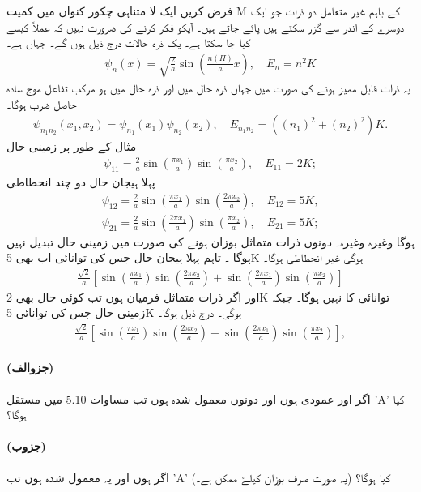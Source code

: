 فرض کریں ایک لا متناہی چکور کنواں میں کمیت M کے باہم غیر متعامل دو ذرات جو ایک دوسرے کے اندر سے گزر سکتے ہیں پائے جاتے ہیں۔ آپکو فکر کرنے کی ضرورت نہیں کہ عملاً کیسے کیا جا سکتا ہے۔ یک ذرہ حالات درج ذیل ہوں گے۔ جہاں 
ہے۔
\begin{align*}
 \psi_{n} (x)=\sqrt{\frac{2}{a}}\sin(\frac{n (\Pi)}{a}x), \quad E_{n}=n^2 K 
\end{align*}
یہ ذرات قابل ممیز ہونے کی صورت میں جہاں ذرہ  حال    میں اور ذرہ  حال   میں ہو مرکب تفاعل موج سادہ حاصل ضرب ہوگا۔
\begin{align*}
 \psi_{n_{1} n_{2}} (x_{1},x_{2})=\psi_{n_{1}}(x_{1})\psi_{n_{2}}(x_{2}), \quad E_{n_{1} n_{2}}= ((n_{1})^2+(n_{2})^2)K. 
\end{align*}
مثال کے طور پر زمینی حال
\begin{align*}
 \psi_{11}=\frac{2}{a}\sin(\frac{\pi x_{1}}{a}) \sin(\frac{\pi x_{2}}{a}), \quad E_{11}=2K; 
\end{align*}
پہلا ہیجان حال دو چند انحطاطی 
\begin{align*}
 \psi_{12}=\frac{2}{a}\sin(\frac{\pi x_{1}}{a}) \sin(\frac{2\pi x_{2}}{a}), \quad E_{12}=5K, \\
\psi_{21}=\frac{2}{a}\sin(\frac{2\pi x_{1}}{a}) \sin(\frac{\pi x_{2}}{a}), \quad E_{21}=5K; 
\end{align*}
ہوگا وغیرہ وغیرہ۔ دونوں ذرات متماثل بوزان ہونے کی صورت میں زمینی حال تبدیل نہیں ہوگا ۔ تاہم پہلا ہیجان حال جس کی توانائی اب بھی 5K ہوگی غیر انحطاطی ہوگا۔
\begin{align*}
\frac{\sqrt{2}}{a}[\sin(\frac{\pi x_{1}}{a})\sin(\frac{2\pi x_{2}}{a})+ \sin(\frac{2 \pi x_{1}}{a})\sin(\frac{\pi x_{2}}{a})]
\end{align*} 
اور اگر ذرات متماثل فرمیان ہوں تب کوئی حال بھی 2K توانائی کا نہیں ہوگا۔ جبکہ زمینی حال جس کی توانائی 5K ہوگی۔ درج ذیل ہوگا۔
\begin{align*}
\frac{\sqrt{2}}{a}[\sin(\frac{\pi x_{1}}{a}) \sin(\frac{2 \pi x_{2}}{a})- \sin(\frac{2 \pi x_{1}}{a}) \sin(\frac{\pi x_{2}}{a})], 
\end{align*}
\paragraph*{(جزوالف)}
اگر  اور   عمودی ہوں اور دونوں معمول شدہ ہوں تب مساوات 5.10 میں مستقل 'A' کیا ہوگا؟ 
\paragraph*{(جزوب)}
اگر   ہوں اور یہ معمول شدہ ہوں تب 'A' کیا ہوگا؟ (یہ صورت صرف بوزان کیلۓ ممکن ہے۔)
